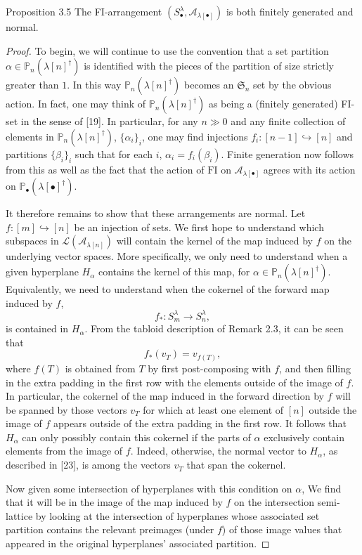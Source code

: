 \begin{sourceblock}{Proposition 3.5}
The FI-arrangement $(S_\bullet^\lambda,\mathcal{A}_{\lambda[\bullet]})$ is both finitely generated and normal.
\end{sourceblock}
\begin{proof}
To begin, we will continue to use the convention that a set partition $\alpha\in\mathbb{P}_n(\lambda[n]^\dagger)$ is identified with the pieces of the partition of size strictly greater than $1$. In this way $\mathbb{P}_n(\lambda[n]^\dagger)$ becomes an $\mathfrak{S}_n$ set by the obvious action. In fact, one may think of $\mathbb{P}_n(\lambda[n]^\dagger)$ as being a (finitely generated) FI-set in the sense of [19]. In particular, for any $n\gg0$ and any finite collection of elements in $\mathbb{P}_n(\lambda[n]^\dagger)$, $\{\alpha_i\}_i$, one may find injections $f_i:[n-1]\hookrightarrow[n]$ and partitions $\{\beta_i\}_i$ such that for each $i$, $\alpha_i=f_i(\beta_i)$. Finite generation now follows from this as well as the fact that the action of $\mathrm{FI}$ on $\mathcal{A}_{\lambda[\bullet]}$ agrees with its action on $\mathbb{P}_\bullet(\lambda[\bullet]^\dagger)$.

It therefore remains to show that these arrangements are normal. Let $f:[m]\hookrightarrow[n]$ be an injection of sets. We first hope to understand which subspaces in $\mathcal{L}(\mathcal{A}_{\lambda[n]})$ will contain the kernel of the map induced by $f$ on the underlying vector spaces. More specifically, we only need to understand when a given hyperplane $H_\alpha$ contains the kernel of this map, for $\alpha\in\mathbb{P}_n(\lambda[n]^\dagger)$. Equivalently, we need to understand when the cokernel of the forward map induced by $f$,
\[
 f_*:S_m^\lambda\to S_n^\lambda,
\]
is contained in $H_\alpha$. From the tabloid description of Remark 2.3, it can be seen that
\[
 f_*(v_T)=v_{f(T)},
\]
where $f(T)$ is obtained from $T$ by first post-composing with $f$, and then filling in the extra padding in the first row with the elements outside of the image of $f$. In particular, the cokernel of the map induced in the forward direction by $f$ will be spanned by those vectors $v_T$ for which at least one element of $[n]$ outside the image of $f$ appears outside of the extra padding in the first row. It follows that $H_\alpha$ can only possibly contain this cokernel if the parts of $\alpha$ exclusively contain elements from the image of $f$. Indeed, otherwise, the normal vector to $H_\alpha$, as described in [23], is among the vectors $v_T$ that span the cokernel.

Now given some intersection of hyperplanes with this condition on $\alpha$, We find that it will be in the image of the map induced by $f$ on the intersection semi-lattice by looking at the intersection of hyperplanes whose associated set partition contains the relevant preimages (under $f$) of those image values that appeared in the original hyperplanes' associated partition.
\end{proof}

